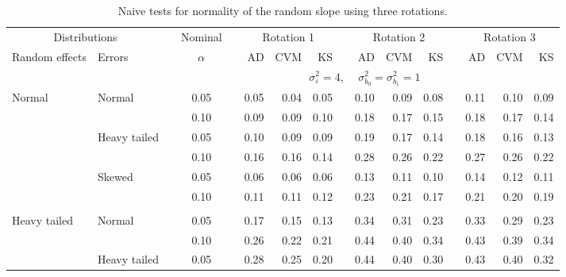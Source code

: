 \documentclass{article} %
\begin{document}
\begin{table}[ht]
\begin{scriptsize}
\begin{center}
\begin{tabular}{ll p{.1cm} c p{.1cm} rrr p{.1cm} rrr p{.1cm} rrr}
   \hline
\end{tabular}
\end{center}
\end{scriptsize}
\end{table}



\begin{table}[ht]
\caption{Naive tests for normality of the random slope using three rotations.}
\begin{scriptsize}
\begin{center}
\begin{tabular}{ll p{.1cm} c p{.1cm} rrr p{.1cm} rrr p{.1cm} rrr}
  \hline
  \multicolumn{2}{c}{Distributions}& & Nominal & &  \multicolumn{3}{c}{Rotation 1} & & \multicolumn{3}{c}{Rotation 2} & & \multicolumn{3}{c}{Rotation 3}\\ \cline{1-2} \cline{6-8} \cline{10-12} \cline{14-16}
  Random effects & Errors & & $\alpha$ & & AD & CVM & KS & & AD & CVM & KS & & AD & CVM & KS \\ 
   \hline
& && && \multicolumn{9}{c}{$\sigma_{\varepsilon}^2 = 4$, \ \ $\sigma_{b_0}^2 = \sigma_{b_1}^2 = 1$} \\ \cline{6-16}
\rowcolor{gray!20}Normal       & Normal       && 0.05 &&   0.05 & 0.04 & 0.05 && 0.10 & 0.09 & 0.08 && 0.11 & 0.10 & 0.09 \\
\rowcolor{gray!20}             &              && 0.10 &&   0.09 & 0.09 & 0.10 && 0.18 & 0.17 & 0.15 && 0.18 & 0.17 & 0.14 \\
\rowcolor{gray!20}             & Heavy tailed && 0.05 &&   0.10 & 0.09 & 0.09 && 0.19 & 0.17 & 0.14 && 0.18 & 0.16 & 0.13 \\
\rowcolor{gray!20}             &              && 0.10 &&   0.16 & 0.16 & 0.14 && 0.28 & 0.26 & 0.22 && 0.27 & 0.26 & 0.22 \\
\rowcolor{gray!20}             & Skewed       && 0.05 &&   0.06 & 0.06 & 0.06 && 0.13 & 0.11 & 0.10 && 0.14 & 0.12 & 0.11 \\
\rowcolor{gray!20}             &              && 0.10 &&   0.11 & 0.11 & 0.12 && 0.23 & 0.21 & 0.17 && 0.21 & 0.20 & 0.19 \\
             &&&&&&&&&&&&&&&\\
Heavy tailed & Normal       && 0.05 &&   0.17 & 0.15 & 0.13 && 0.34 & 0.31 & 0.23 &&  0.33 & 0.29 & 0.23 \\
             &              && 0.10 &&   0.26 & 0.22 & 0.21 && 0.44 & 0.40 & 0.34 &&  0.43 & 0.39 & 0.34 \\
             & Heavy tailed && 0.05 &&   0.28 & 0.25 & 0.20 && 0.44 & 0.40 & 0.30 &&  0.43 & 0.40 & 0.32 \\

\end{tabular}
\end{center}
\end{scriptsize}
\end{table}
\end{document}
